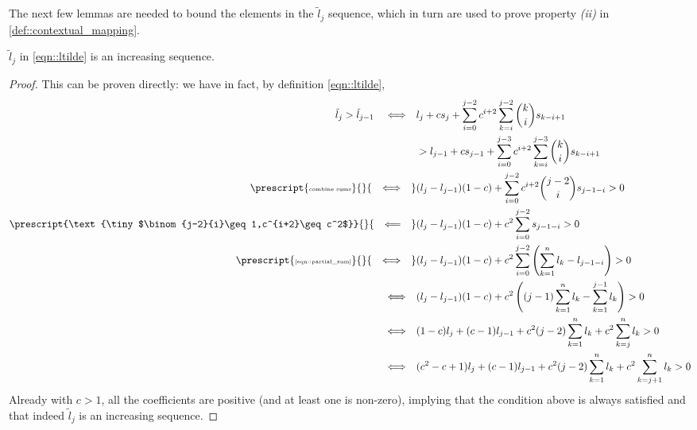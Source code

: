 The next few lemmas are needed to bound the elements in the $\tilde{l}_j$ sequence, which in turn are used to prove property \emph{(ii)} in \cref{def::contextual_mapping}.

\begin{lemma}
\label{thm::ltilde_increasing}
    $\tilde{l}_j$ in \cref{eqn::ltilde} is an increasing sequence.
\end{lemma}
\begin{proof}
This can be proven directly: we have in fact, by definition \cref{eqn::ltilde},
    \begin{equation}
    \begin{split}
        \tilde{l}_j>\tilde{l}_{j-1} \quad\Longleftrightarrow\quad&
            l_j + cs_j +\sum_{i=0}^{j-2}c^{i+2}\sum_{k=i}^{j-2}\binom{k}{i}s_{k-i+1}\\
            &>l_{j-1} + cs_{j-1} +\sum_{i=0}^{j-3}c^{i+2}\sum_{k=i}^{j-3}\binom{k}{i}s_{k-i+1}\\
            \prescript{\text{\tiny combine sums}}{}{\quad\Longleftrightarrow\quad}&
            (l_j-l_{j-1})(1-c) +\sum_{i=0}^{j-2}c^{i+2}\binom{j-2}{i}s_{j-1-i}>0\\
            \prescript{\text{\tiny $\binom{j-2}{i}\geq1,c^{i+2}\geq c^2$}}{}{\quad\Longleftarrow\quad}&
            (l_j-l_{j-1})(1-c) +c^2\sum_{i=0}^{j-2}s_{j-1-i}>0\\
            \prescript{\text{\tiny \cref{eqn::partial_sum}}}{}{\quad\Longleftrightarrow\quad}&
            (l_j-l_{j-1})(1-c) +c^2\sum_{i=0}^{j-2}\left(\sum_{k=1}^n l_k - l_{j-1-i}\right)>0\\
            \quad\Longleftrightarrow\quad&(l_j-l_{j-1})(1-c) +c^2\left((j-1)\sum_{k=1}^n l_k - \sum_{k=1}^{j-1}l_{k}\right)>0\\
            \quad\Longleftrightarrow\quad&(1-c)l_j+(c-1)l_{j-1} +c^2(j-2)\sum_{k=1}^n l_k + c^2\sum_{k=j}^{n}l_{k}>0\\
            \quad\Longleftrightarrow\quad&(c^2-c+1)l_j+(c-1)l_{j-1}
            +c^2(j-2)\sum_{k=1}^n l_k + c^2\sum_{k=j+1}^{n}l_{k}>0\\
    \end{split}
    \end{equation}
    Already with $c>1$, all the coefficients are positive (and at least one is non-zero), implying that the condition above is always satisfied and that indeed $\tilde{l}_j$ is an increasing sequence.
\end{proof}



